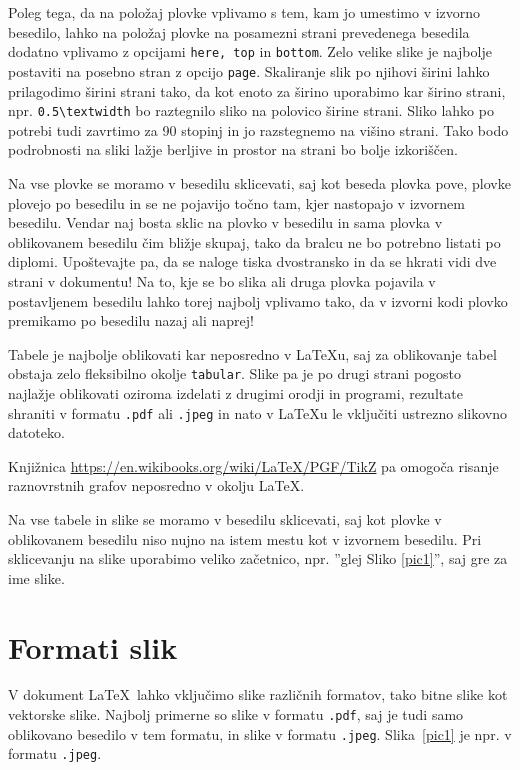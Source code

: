 \documentclass[a4paper,12pt,openright]{book}
\begin{document}
Poleg tega, da na položaj plovke vplivamo s tem, kam jo umestimo v izvorno besedilo, lahko na položaj plovke na posamezni strani prevedenega besedila dodatno vplivamo z opcijami \texttt{here, top} in \texttt{bottom}.
Zelo velike slike je najbolje postaviti na posebno stran z opcijo \texttt{page}.
Skaliranje slik po njihovi širini lahko prilagodimo širini strani tako, da kot enoto za širino uporabimo kar širino strani, npr. \verb=0.5\textwidth= bo raztegnilo sliko na polovico širine strani.
Sliko lahko po potrebi tudi zavrtimo za 90 stopinj in jo razstegnemo na višino strani. 
Tako bodo podrobnosti na sliki lažje berljive in prostor na strani bo bolje izkoriščen.

Na vse plovke se moramo v besedilu sklicevati, saj kot beseda plovka pove, plovke plovejo po besedilu in se ne pojavijo točno tam, kjer nastopajo v izvornem besedilu.
Vendar naj bosta  sklic na plovko v besedilu in sama plovka v oblikovanem besedilu čim bližje skupaj, tako da bralcu ne bo potrebno listati po diplomi. 
Upoštevajte pa, da se naloge tiska dvostransko in da se hkrati vidi dve strani v dokumentu!
Na to, kje se bo slika ali druga plovka pojavila v postavljenem besedilu lahko torej najbolj vplivamo tako, da v izvorni kodi plovko premikamo po besedilu nazaj ali naprej!

Tabele je najbolje oblikovati kar neposredno v \LaTeX u, saj za oblikovanje tabel obstaja zelo fleksibilno okolje \texttt{tabular}.
Slike pa je po drugi strani  pogosto najla\v zje oblikovati oziroma izdelati z drugimi orodji in programi, rezultate shraniti v formatu {\tt .pdf} ali {\tt .jpeg} in nato v \LaTeX u le vključiti ustrezno slikovno datoteko.

Knjižnica \url{https://en.wikibooks.org/wiki/LaTeX/PGF/TikZ} 
pa omo\-go\-ča risanje raznovrstnih grafov neposredno v okolju \LaTeX .

Na vse tabele in slike se moramo v besedilu sklicevati, saj kot plovke v oblikovanem besedilu niso nujno na istem mestu kot v izvornem besedilu.
Pri sklicevanju na slike uporabimo veliko začetnico, npr. ''glej Sliko \ref{pic1}'', saj gre za ime slike.



\section{Formati slik}

V  dokument \LaTeX\ lahko vključimo slike različnih formatov, tako
bitne slike kot vektorske slike. Najbolj primerne so slike v formatu {\tt .pdf}, saj je tudi samo
oblikovano besedilo v tem formatu, in slike v formatu {\tt .jpeg}.
Slika~\ref{pic1} je npr. v formatu {\tt .jpeg}.
\end{document}
